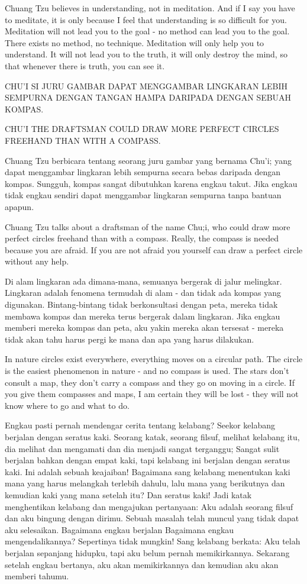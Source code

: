 \english
Chuang Tzu believes in understanding, not in meditation. And if I say you have to meditate, it is only because I feel that understanding is so difficult for you. Meditation will not lead you to the goal - no method can lead you to the goal. There exists no method, no technique. Meditation will only help you to understand. It will not lead you to the truth, it will only destroy the mind, so that whenever there is truth, you can see it.

\bahasa
CHU'I SI JURU GAMBAR DAPAT MENGGAMBAR LINGKARAN LEBIH SEMPURNA DENGAN TANGAN HAMPA DARIPADA DENGAN SEBUAH KOMPAS.

\english
CHU'I THE DRAFTSMAN COULD DRAW MORE PERFECT CIRCLES FREEHAND THAN WITH A COMPASS.

\bahasa
Chuang Tzu berbicara tentang seorang juru gambar yang bernama Chu'i; yang dapat menggambar lingkaran lebih sempurna secara bebas daripada dengan kompas. Sungguh, kompas sangat dibutuhkan karena engkau takut. Jika engkau tidak engkau sendiri dapat menggambar lingkaran sempurna tanpa bantuan apapun.

\english
Chuang Tzu talks about a draftsman of the name Chu;i, who could draw more perfect circles freehand than with a compass. Really, the compass is needed because you are afraid. If you are not afraid you yourself can draw a perfect circle without any help.

\bahasa
Di alam lingkaran ada dimana-mana, semuanya bergerak di jalur melingkar. Lingkaran adalah fenomena termudah di alam - dan tidak ada kompas yang digunakan. Bintang-bintang tidak berkonsultasi dengan peta, mereka tidak membawa kompas dan mereka terus bergerak dalam lingkaran. Jika engkau memberi mereka kompas dan peta, aku yakin mereka akan tersesat - mereka tidak akan tahu harus pergi ke mana dan apa yang harus dilakukan.

\english
In nature circles exist everywhere, everything moves on a circular path. The circle is the easiest phenomenon in nature - and no compass is used. The stars don't consult a map, they don't carry a compass and they go on moving in a circle. If you give them compasses and maps, I am certain they will be lost - they will not know where to go and what to do.

\bahasa
Engkau pasti pernah mendengar cerita tentang kelabang? Seekor kelabang berjalan dengan seratus kaki. Seorang katak, seorang filsuf, melihat kelabang itu, dia melihat dan mengamati dan dia menjadi sangat terganggu; Sangat sulit berjalan bahkan dengan empat kaki, tapi kelabang ini berjalan dengan seratus kaki. Ini adalah sebuah keajaiban! Bagaimana sang kelabang menentukan kaki mana yang harus melangkah terlebih dahulu, lalu mana yang berikutnya dan kemudian kaki yang mana setelah itu? Dan seratus kaki! Jadi katak menghentikan kelabang dan mengajukan pertanyaan: Aku adalah seorang filsuf dan aku bingung dengan dirimu. Sebuah masalah telah muncul yang tidak dapat aku selesaikan. Bagaimana engkau berjalan Bagaimana engkau mengendalikannya? Sepertinya tidak mungkin! Sang kelabang berkata: Aku telah berjalan sepanjang hidupku, tapi aku belum pernah memikirkannya. Sekarang setelah engkau bertanya, aku akan memikirkannya dan kemudian aku akan memberi tahumu.

